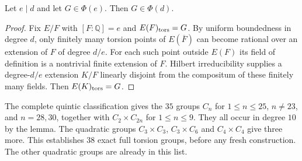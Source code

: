 \begin{lemma}
Let $e\mid d$ and let $G\in\Phi(e)$. Then $G\in\Phi(d)$.
\end{lemma}
\begin{proof}
Fix $E/F$ with $[F:\mathbb Q]=e$ and $E(F)_{\rm tors}=G$.
By uniform boundedness in degree $d$, only finitely many torsion points of
$E(\overline F)$ can become rational over an extension of $F$ of degree
$d/e$. For each such point outside $E(F)$ its field of definition is a
nontrivial finite extension of $F$. Hilbert irreducibility supplies a
degree-$d/e$ extension $K/F$ linearly disjoint from the compositum of
these finitely many fields. Then $E(K)_{\rm tors}=G$.
\end{proof}

The complete quintic classification gives the $35$ groups
$C_n$ for $1\le n\le25$, $n\ne23$, and $n=28,30$, together with
$C_2\times C_{2n}$ for $1\le n\le9$.
They all occur in degree $10$ by the lemma. The quadratic groups
$C_3\times C_3$, $C_3\times C_6$ and $C_4\times C_4$ give three more.
This establishes $38$ exact full torsion groups, before any fresh
construction. The other quadratic groups are already in this list.
